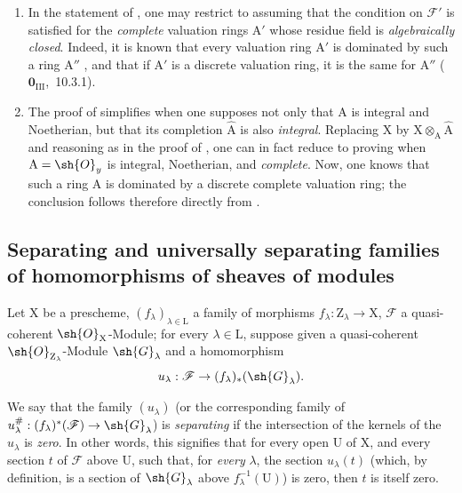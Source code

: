 \begin{remarks}[11.8.2]
\label{IV.11.8.2}
\medskip\noindent
\begin{enumerate}[label=(\roman*)]
  \item In the statement of , one may restrict to assuming that the condition on $\mathscr{F}'$ is satisfied for the \emph{complete} valuation rings $\mathrm{A}'$ whose residue field is \emph{algebraically closed}.
  Indeed, it is known that every valuation ring $\mathrm{A}'$ is dominated by such a ring $\mathrm{A}''$ , and that if $\mathrm{A}'$ is a discrete valuation ring, it is the same for $\mathrm{A}''$ ($\mathbf{0}_{\mathrm{III}}$,~10.3.1).
  \item The proof of  simplifies when one supposes not only that $\mathrm{A}$ is integral and Noetherian, but that its completion $\hat{\mathrm{A}}$ is also \emph{integral}.
  Replacing $\mathrm{X}$ by $\mathrm{X}\otimes_\mathrm{A}\hat{\mathrm{A}}$ and reasoning as in the proof of , one can in fact reduce to proving  when $\mathrm{A}=\sh{O}_y$ is integral, Noetherian, and \emph{complete}.
  Now, one knows  that such a ring $\mathrm{A}$ is dominated by a discrete complete valuation ring; the conclusion follows therefore directly from .
\end{enumerate}
\end{remarks}

\subsection{Separating and universally separating families of homomorphisms of sheaves of modules}
\label{subsection:IV.11.9}

\begin{env}[11.9.1]
\label{IV.11.9.1}
Let $\mathrm{X}$ be a prescheme, $(f_\lambda)_{\lambda\in\mathrm{L}}$ a family of morphisms $f_\lambda:\mathrm{Z}_\lambda\to\mathrm{X}$, $\mathscr{F}$ a quasi-coherent $\sh{O}_\mathrm{X}$-Module; for every $\lambda\in\mathrm{L}$, suppose given a quasi-coherent $\sh{O}_{\mathrm{Z}_\lambda}$-Module $\sh{G}_\lambda$ and a homomorphism
\[
  u_\lambda:\mathscr{F}\to(f_\lambda)_*(\sh{G}_\lambda).
\label{IV.11.9.1.1}
\]
\end{env}

We say that the family $(u_\lambda)$ (or the corresponding family of $u_\lambda^{\#}:(f_\lambda)^*(\mathscr{F})\to\sh{G}_\lambda$) is \emph{separating} if the intersection of the kernels of the $u_\lambda$ is \emph{zero}.
In other words, this signifies that for every open $\mathrm{U}$ of $\mathrm{X}$, and every section $t$ of $\mathscr{F}$ above $\mathrm{U}$, such that, for \emph{every} $\lambda$, the section $u_\lambda(t)$ (which, by definition, is a section of $\sh{G}_\lambda$ above $f_\lambda^{-1}(\mathrm{U})$) is zero, then $t$ is itself zero.

